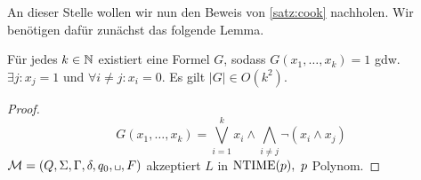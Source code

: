 
An dieser Stelle wollen wir nun den Beweis von \autoref{satz:cook} nachholen.
Wir benötigen dafür zunächst das folgende Lemma.
\begin{lemma}
	Für jedes $k\in\mathbb{N}$ existiert eine Formel $G$, sodass $G(x_1,\dots,x_k)=1$ gdw. $\exists j: x_j = 1$ und $\forall i \neq j: x_i = 0$. Es gilt $|G| \in O(k^2)$.
\end{lemma}
\begin{proof}
	\[ G(x_1,\dots,x_k) = \bigvee_{i=1}^k x_i\land \bigwedge_{i\neq j}\neg (x_i\land x_j) \]
	$\M=(Q,\Sigma,\Gamma,\delta,q_0,\blank,F)$ akzeptiert $L$ in $\operatorname{NTIME}(p),\ p$ Polynom.
\end{proof}

